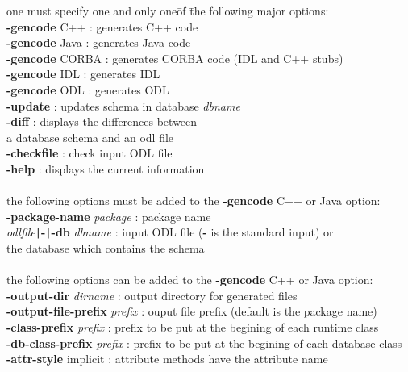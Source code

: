 \begin{tabbing}
one must specify one and only one\= of \=the following major options:\\
{\bf -gencode} C++                 \>: generates C++ code\\
{\bf -gencode} Java                \>: generates Java code\\
{\bf -gencode} CORBA               \>: generates CORBA code (IDL and C++ stubs)\\
{\bf -gencode} IDL                 \>: generates IDL\\
{\bf -gencode} ODL                 \>: generates ODL\\
{\bf -update}                      \>: updates schema in database \emph{dbname}\\
{\bf -diff}                        \>: displays the differences between\\
                             \>\> a database schema and an odl file\\
{\bf -checkfile}                   \>: check input ODL file\\
{\bf -help}                        \>: displays the current information\\
\\
the following options must be added to the {\bf -gencode} C++ or Java option:\\
{\bf -package-name} \emph{package}      \>: package name\\
\emph{odlfile}\texttt{|}{\bf -\texttt{|}-db} \emph{dbname} \>: input ODL file ({\bf -} is the standard input) or\\
                             \>\> the database which contains the schema\\
\\
the following options can be added to the {\bf -gencode} C++ or Java option:\\
{\bf -output-dir} \emph{dirname}        \>: output directory for generated files\\
{\bf -output-file-prefix} \emph{prefix} \>: ouput file prefix (default is the package name)\\
{\bf -class-prefix} \emph{prefix}       \>: prefix to be put at the begining of each runtime class\\
{\bf -db-class-prefix} \emph{prefix}    \>: prefix to be put at the begining of each database class\\
{\bf -attr-style} implicit         \>: attribute methods have the attribute name\\

\end{tabbing}
